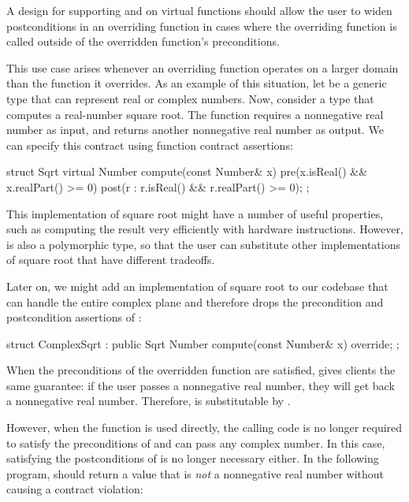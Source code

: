 
A design for supporting  and  on virtual functions should allow the user to widen postconditions in an overriding function in cases where the overriding function is called outside of the overridden function's preconditions.

This use case arises whenever an overriding function operates on a larger domain than the function it overrides. As an example of this situation, let  be a generic type that can represent real or complex numbers. Now, consider a type  that computes a real-number square root. The function  requires a nonnegative real number as input, and returns another nonnegative real number as output. We can specify this contract using function contract assertions:

\begin{codeblock}
struct Sqrt {
  virtual Number compute(const Number& x)
    pre(x.isReal() && x.realPart() >= 0)
    post(r : r.isReal() && r.realPart() >= 0);
};
\end{codeblock}

This implementation of square root might have a number of useful properties, such as computing the result very efficiently with hardware instructions. However,  is also a polymorphic type, so that the user can substitute other implementations of square root that have different tradeoffs.

Later on, we might add an implementation of square root to our codebase that can handle the entire complex plane and therefore drops the precondition and postcondition assertions of :

\begin{codeblock}
struct ComplexSqrt : public Sqrt {
  Number compute(const Number& x) override;
};
\end{codeblock}
When the preconditions of the overridden function  are satisfied, \allowbreak{} gives clients the same guarantee: if the user passes a nonnegative real number, they will get back a nonnegative real number. Therefore,  is substitutable by . 

However, when the function  is used directly, the calling code is no longer required to satisfy the preconditions of  and can pass any complex number. In this case, satisfying the postconditions of  is no longer necessary either. In the following program,  should return a value that is \emph{not} a nonnegative real number without causing a contract violation:

